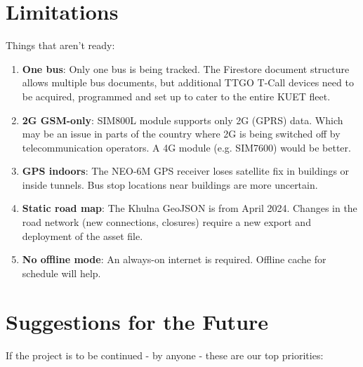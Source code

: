 \documentclass[12pt,a4paper]{report}
\begin{document}
\section{Limitations}

Things that aren't ready:

\begin{enumerate}[leftmargin=*, label=\arabic*.]
	\item \textbf{One bus}: Only one bus is being tracked. The Firestore document structure allows multiple bus documents, but additional TTGO T-Call devices need to be acquired, programmed and set up to cater to the entire KUET fleet.
	\item \textbf{2G GSM-only}: SIM800L module supports only 2G (GPRS) data. Which may be an issue in parts of the country where 2G is being switched off by telecommunication operators. A 4G module (e.g. SIM7600) would be better.
	\item \textbf{GPS indoors}: The NEO-6M GPS receiver loses satellite fix in buildings or inside tunnels. Bus stop locations near buildings are more uncertain.
	
	\item \textbf{Static road map}: The Khulna GeoJSON is from April 2024. Changes in the road network (new connections, closures) require a new export and deployment of the asset file.
	\item \textbf{No offline mode}: An always-on internet is required. Offline cache for schedule will help.
\end{enumerate}

\section{Suggestions for the Future}

If the project is to be continued - by anyone - these are our top priorities:
\end{document}
